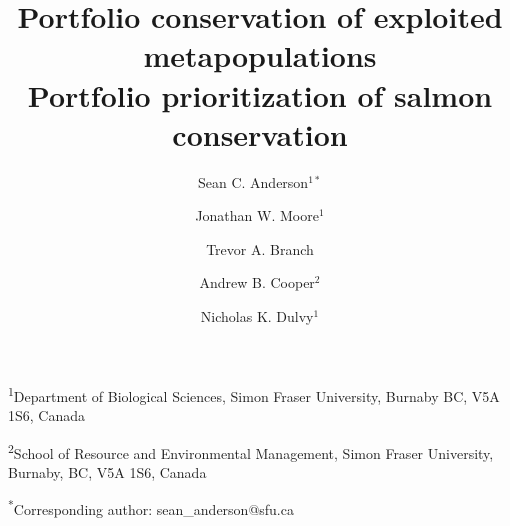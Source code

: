 \documentclass[12pt]{article}
\title{Portfolio conservation of exploited metapopulations\\Portfolio 
  prioritization of salmon conservation }
\author{Sean C. Anderson$^{1*}$ \and Jonathan W. Moore$^1$ \and Trevor A. Branch
  \and Andrew B. Cooper$^2$ \and Nicholas K.  Dulvy$^1$}
\date{}
\begin{document}
\begin{spacing}{1.2}
\maketitle

\noindent
  \textsuperscript{1}Department of Biological Sciences, Simon Fraser
  University, Burnaby BC, V5A 1S6, Canada

\noindent
	\textsuperscript{2}School of Resource and Environmental Management, Simon
  Fraser University, Burnaby, BC, V5A 1S6, Canada

\noindent
	\textsuperscript{*}Corresponding author: sean\_anderson@sfu.ca

\clearpage




\renewcommand{\thetable}{S\arabic{table}}
\setcounter{table}{0} %

\renewcommand{\thefigure}{S\arabic{figure}}
\renewcommand{\figurename}{Fig.}
\setcounter{figure}{0}  %



\end{spacing}
\end{document}
